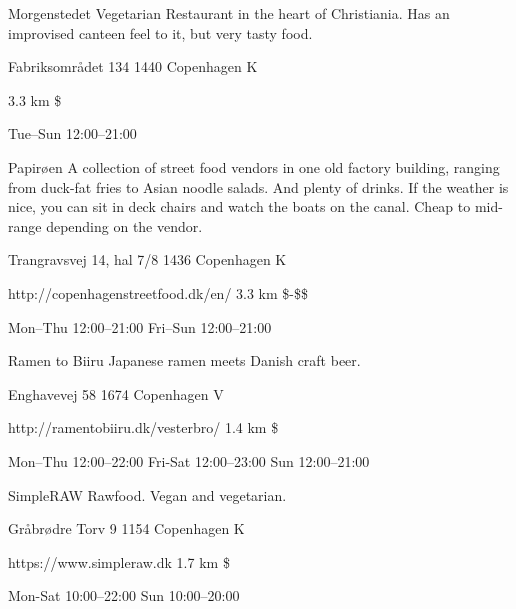 \begin{fooditemwourl}
{Morgenstedet}
{Vegetarian Restaurant in the heart of Christiania. Has an improvised canteen feel to it, but very tasty food.}
{\begin{addr}
{Fabriksområdet 134}
{1440 Copenhagen K}
\end{addr}}
{3.3 km}
{\$}
{\begin{ohours}
{Tue–Sun}
{12:00–21:00}
{}
{}
{}
{}
{}
{}
\end{ohours}}
\end{fooditemwourl}
\begin{fooditem}
{Papirøen}
{A collection of street food vendors in one old factory building, ranging from duck-fat fries to Asian noodle salads. And plenty of drinks. If the weather is nice, you can sit in deck chairs and watch the boats on the canal. Cheap to mid-range depending on the vendor.}
{\begin{addr}
{Trangravsvej 14, hal 7/8}
{1436 Copenhagen K}
\end{addr}}
{http://copenhagenstreetfood.dk/en/}
{3.3 km}
{\$-\$\$}
{\begin{ohours}
{Mon–Thu}
{12:00–21:00}
{Fri–Sun}
{12:00–21:00}
{}
{}
{}
{}
\end{ohours}}
\end{fooditem}
\begin{fooditem}
{Ramen to Biiru}
{Japanese ramen meets Danish craft beer.}
{\begin{addr}
{Enghavevej 58}
{1674 Copenhagen V}
\end{addr}}
{http://ramentobiiru.dk/vesterbro/}
{1.4 km}
{\$}
{\begin{ohours}
{Mon--Thu}
{12:00–22:00}
{​​Fri-Sat}
{12:00–23:00}
{​Sun}
{12:00–21:00}
{}
{}
\end{ohours}}
\end{fooditem}
\begin{fooditem}
{SimpleRAW}
{Rawfood. Vegan and vegetarian.}
{\begin{addr}
{Gråbrødre Torv 9}
{1154 Copenhagen K}
\end{addr}}
{https://www.simpleraw.dk}
{1.7 km}
{\$}
{\begin{ohours}
{Mon-Sat}
{10:00–22:00}
{Sun}
{10:00–20:00}
{}
{}
{}
{}
\end{ohours}}
\end{fooditem}










